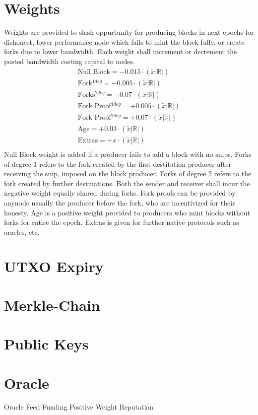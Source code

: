 \documentclass[a4paper,10pt]{article}
\begin{document}
\section{Weights}
Weights are provided to slash oppurtunity for producing blocks in next epochs for dishonest, lower performance node which fails to mint the block fully, or create forks due to lower bandwidth. Each weight shall increment or decrement the posted bandwidth costing capital to nodes.
\begin{align*}
\text{Null Block} = -0.015 \cdot (\widetilde{x}|\mathbb{R}|)\\
\text{Fork$^{1deg}$} = -0.005 \cdot (\widetilde{x}|\mathbb{R}|)\\
\text{Forks$^{2deg}$} = -0.07 \cdot (\widetilde{x}|\mathbb{R}|)\\
\text{Fork Proof$^{1deg}$} = +0.005 \cdot (\widetilde{x}|\mathbb{R}|)\\
\text{Fork Proof$^{2deg}$} = +0.07 \cdot (\widetilde{x}|\mathbb{R}|)\\
\text{Age} = +0.03 \cdot (\widetilde{x}|\mathbb{R}|)\\
\text{Extras} = +x \cdot (\widetilde{x}|\mathbb{R}|)\\
\end{align*}
Null Block weight is added if a producer fails to add a block with no snips. Forks of degree 1 refers to the fork created by the first destitation producer after receiving the snip, imposed on the block producer. Forks of degree 2 refers to the fork created by further destinations. Both the sender and receiver shall incur the negative weight equally shared during forks. Fork proofs can be provided by anynode usually the producer before the fork, who are incentivized for their honesty. Age is a positive weight provided to producers who mint blocks without forks for entire the epoch. Extras is given for further native protocols such as oracles, etc.
\section{UTXO Expiry}
\section{Merkle-Chain}
\section{Public Keys}

\section{Oracle}
Oracle Feed Funding
Positive Weight
Reputation
\end{document}
